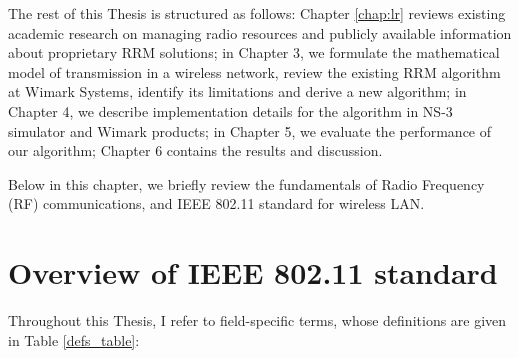 
The rest of this Thesis is structured as follows: Chapter \ref{chap:lr} reviews existing academic research on managing radio resources and publicly available information about proprietary RRM solutions; in Chapter 3, we formulate the mathematical model of transmission in a wireless network, review the existing RRM algorithm at Wimark Systems, identify its limitations and derive a new algorithm; in Chapter 4, we describe implementation details for the algorithm in NS-3 simulator and Wimark products; in Chapter 5, we evaluate the performance of our algorithm; Chapter 6 contains the results and discussion.



Below in this chapter, we briefly review the fundamentals of Radio Frequency (RF) communications, and IEEE 802.11 standard for wireless LAN.

\section{Overview of IEEE 802.11 standard}

Throughout this Thesis, I refer to field-specific terms, whose definitions are given in Table \ref{defs_table}:

